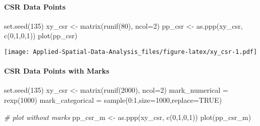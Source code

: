 \documentclass[
]{book}
\newenvironment{Shaded}{\begin{snugshade}}{\end{snugshade}}
\newcommand{\AttributeTok}[1]{\textcolor[rgb]{0.77,0.63,0.00}{#1}}
\newcommand{\CommentTok}[1]{\textcolor[rgb]{0.56,0.35,0.01}{\textit{#1}}}
\newcommand{\ConstantTok}[1]{\textcolor[rgb]{0.00,0.00,0.00}{#1}}
\newcommand{\DecValTok}[1]{\textcolor[rgb]{0.00,0.00,0.81}{#1}}
\newcommand{\FunctionTok}[1]{\textcolor[rgb]{0.00,0.00,0.00}{#1}}
\newcommand{\NormalTok}[1]{#1}
\newcommand{\OtherTok}[1]{\textcolor[rgb]{0.56,0.35,0.01}{#1}}
\newcommand{\SpecialCharTok}[1]{\textcolor[rgb]{0.00,0.00,0.00}{#1}}
\begin{document}
\hypertarget{csr-data-points}{%
\paragraph{CSR Data Points}\label{csr-data-points}}

\begin{Shaded}
\begin{Highlighting}[]
\FunctionTok{set.seed}\NormalTok{(}\DecValTok{135}\NormalTok{)}
\NormalTok{xy\_csr }\OtherTok{\textless{}{-}} \FunctionTok{matrix}\NormalTok{(}\FunctionTok{runif}\NormalTok{(}\DecValTok{80}\NormalTok{), }\AttributeTok{ncol=}\DecValTok{2}\NormalTok{)}
\NormalTok{pp\_csr }\OtherTok{\textless{}{-}} \FunctionTok{as.ppp}\NormalTok{(xy\_csr, }\FunctionTok{c}\NormalTok{(}\DecValTok{0}\NormalTok{,}\DecValTok{1}\NormalTok{,}\DecValTok{0}\NormalTok{,}\DecValTok{1}\NormalTok{))}
\FunctionTok{plot}\NormalTok{(pp\_csr)}
\end{Highlighting}
\end{Shaded}

\texttt{[image: Applied-Spatial-Data-Analysis\_files/figure-latex/xy\_csr-1.pdf]}

\hypertarget{csr-data-points-with-marks}{%
\paragraph{CSR Data Points with Marks}\label{csr-data-points-with-marks}}

\begin{Shaded}
\begin{Highlighting}[]
\FunctionTok{set.seed}\NormalTok{(}\DecValTok{135}\NormalTok{)}
\NormalTok{xy\_csr }\OtherTok{\textless{}{-}} \FunctionTok{matrix}\NormalTok{(}\FunctionTok{runif}\NormalTok{(}\DecValTok{2000}\NormalTok{), }\AttributeTok{ncol=}\DecValTok{2}\NormalTok{)}
\NormalTok{mark\_numerical }\OtherTok{=} \FunctionTok{rexp}\NormalTok{(}\DecValTok{1000}\NormalTok{)}
\NormalTok{mark\_categorical }\OtherTok{=}  \FunctionTok{sample}\NormalTok{(}\DecValTok{0}\SpecialCharTok{:}\DecValTok{1}\NormalTok{,}\AttributeTok{size=}\DecValTok{1000}\NormalTok{,}\AttributeTok{replace=}\ConstantTok{TRUE}\NormalTok{)}

\CommentTok{\# plot without marks}
\NormalTok{pp\_csr\_m }\OtherTok{\textless{}{-}} \FunctionTok{as.ppp}\NormalTok{(xy\_csr, }\FunctionTok{c}\NormalTok{(}\DecValTok{0}\NormalTok{,}\DecValTok{1}\NormalTok{,}\DecValTok{0}\NormalTok{,}\DecValTok{1}\NormalTok{))}
\FunctionTok{plot}\NormalTok{(pp\_csr\_m)}
\end{Highlighting}
\end{Shaded}
\end{document}
